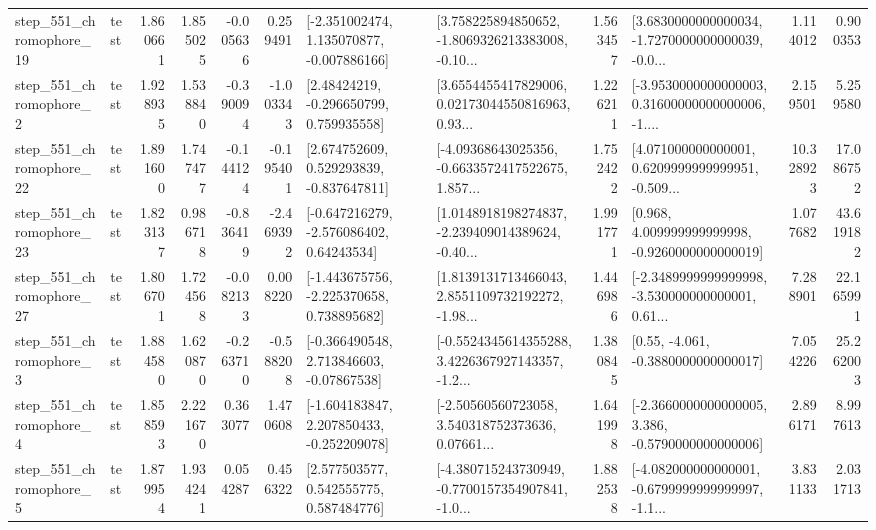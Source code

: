 \begin{tabular}{llrrrrllrlrr}
  step\_551\_chromophore\_19 &      test &      1.860661 &    1.855025 &     -0.005636 &  0.259491 &   [-2.351002474, 1.135070877, -0.007886166] &  [3.758225894850652, -1.8069326213383008, -0.10... &       1.563457 &  [3.6830000000000034, -1.7270000000000039, -0.0... &            1.114012 &          0.900353 \\
   step\_551\_chromophore\_2 &      test &      1.928935 &    1.538840 &     -0.390094 & -1.003343 &     [2.48424219, -0.296650799, 0.759935558] &  [3.6554455417829006, 0.02173044550816963, 0.93... &       1.226211 &  [-3.9530000000000003, 0.31600000000000006, -1.... &            2.159501 &          5.259580 \\
  step\_551\_chromophore\_22 &      test &      1.891600 &    1.747477 &     -0.144124 & -0.195401 &    [2.674752609, 0.529293839, -0.837647811] &  [-4.09368643025356, -0.6633572417522675, 1.857... &       1.752422 &  [4.071000000000001, 0.6209999999999951, -0.509... &           10.328923 &         17.086752 \\
  step\_551\_chromophore\_23 &      test &      1.823137 &    0.986718 &     -0.836419 & -2.469392 &    [-0.647216279, -2.576086402, 0.64243534] &  [1.0148918198274837, -2.239409014389624, -0.40... &       1.991771 &    [0.968, 4.009999999999998, -0.9260000000000019] &            1.077682 &         43.619182 \\
  step\_551\_chromophore\_27 &      test &      1.806701 &    1.724568 &     -0.082133 &  0.008220 &   [-1.443675756, -2.225370658, 0.738895682] &  [1.8139131713466043, 2.8551109732192272, -1.98... &       1.446986 &  [-2.3489999999999998, -3.530000000000001, 0.61... &            7.288901 &         22.165991 \\
   step\_551\_chromophore\_3 &      test &      1.884580 &    1.620870 &     -0.263710 & -0.588208 &    [-0.366490548, 2.713846603, -0.07867538] &  [-0.5524345614355288, 3.4226367927143357, -1.2... &       1.380845 &                [0.55, -4.061, -0.3880000000000017] &            7.054226 &         25.262003 \\
   step\_551\_chromophore\_4 &      test &      1.858593 &    2.221670 &      0.363077 &  1.470608 &   [-1.604183847, 2.207850433, -0.252209078] &  [-2.50560560723058, 3.540318752373636, 0.07661... &       1.641998 &  [-2.3660000000000005, 3.386, -0.5790000000000006] &            2.896171 &          8.997613 \\
   step\_551\_chromophore\_5 &      test &      1.879954 &    1.934241 &      0.054287 &  0.456322 &     [2.577503577, 0.542555775, 0.587484776] &  [-4.380715243730949, -0.7700157354907841, -1.0... &       1.882538 &  [-4.082000000000001, -0.6799999999999997, -1.1... &            3.831133 &          2.031713 \\

\end{tabular}
